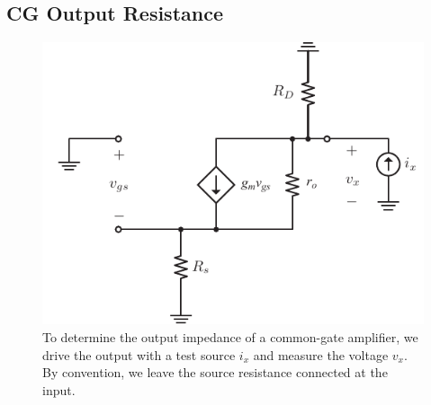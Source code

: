 \subsection{CG Output Resistance}

\begin{figure}[tb]
\begin{center}
\includegraphics[scale=.9]{cgamp_is_ac_ss_rout}
\end{center}
\caption{To determine the output impedance of a common-gate amplifier, we drive the output with a test source $i_x$ and measure the voltage $v_x$.  By convention, we leave the source resistance connected at the input.} \label{fig:cgamp_is_ac_ss_rout}
\end{figure}

